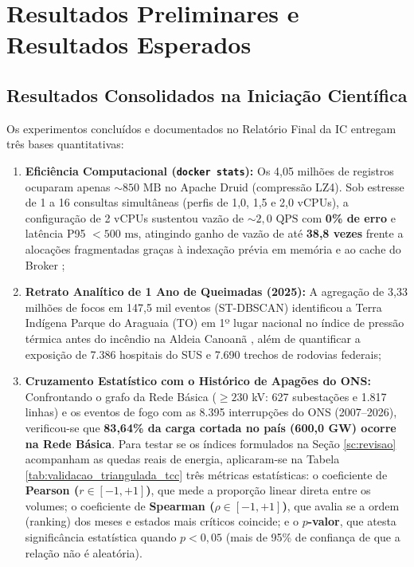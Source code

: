 \section{Resultados Preliminares e Resultados Esperados}
\label{sc:resultados}

\subsection{Resultados Consolidados na Iniciação Científica}
Os experimentos concluídos e documentados no Relatório Final da IC \cite{sampaio2026ic} entregam três bases quantitativas:
\begin{enumerate}
    \item \textbf{Eficiência Computacional (\texttt{docker stats}):} Os 4,05 milhões de registros ocuparam apenas $\sim 850\text{ MB}$ no Apache Druid (compressão LZ4). Sob estresse de 1 a 16 consultas simultâneas (perfis de 1,0, 1,5 e 2,0 vCPUs), a configuração de 2 vCPUs sustentou vazão de $\sim 2{,}0\text{ QPS}$ com \textbf{0\% de erro} e latência P95 $< 500\text{ ms}$, atingindo ganho de vazão de até \textbf{38,8 vezes} frente a alocações fragmentadas graças à indexação prévia em memória e ao cache do Broker \cite{sampaio2026ic};
    \item \textbf{Retrato Analítico de 1 Ano de Queimadas (2025):} A agregação de 3,33 milhões de focos em 147,5 mil eventos (ST-DBSCAN) identificou a Terra Indígena Parque do Araguaia (TO) em 1º lugar nacional no índice de pressão térmica antes do incêndio na Aldeia Canoanã \cite{g1_canoana_2026}, além de quantificar a exposição de 7.386 hospitais do SUS e 7.690 trechos de rodovias federais;
    \item \textbf{Cruzamento Estatístico com o Histórico de Apagões do ONS:} Confrontando o grafo da Rede Básica ($\ge 230$ kV: 627 subestações e 1.817 linhas) e os eventos de fogo com as 8.395 interrupções do ONS (2007--2026), verificou-se que \textbf{83,64\% da carga cortada no país (600,0 GW) ocorre na Rede Básica}. Para testar se os índices formulados na Seção \ref{sc:revisao} acompanham as quedas reais de energia, aplicaram-se na Tabela \ref{tab:validacao_triangulada_tcc} três métricas estatísticas: o coeficiente de \textbf{Pearson ($r \in [-1, +1]$)}, que mede a proporção linear direta entre os volumes; o coeficiente de \textbf{Spearman ($\rho \in [-1, +1]$)}, que avalia se a ordem (ranking) dos meses e estados mais críticos coincide; e o \textbf{$p$-valor}, que atesta significância estatística quando $p < 0{,}05$ (mais de 95\% de confiança de que a relação não é aleatória).
\end{enumerate}

